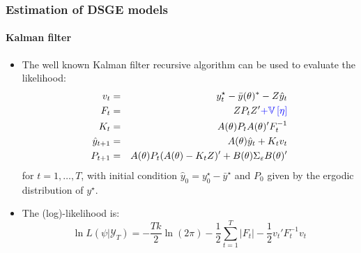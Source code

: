 \documentclass[10pt,slidestop]{beamer}
\newcommand{\sample}{\mathcal Y_T}
\begin{document}
\begin{frame}
  \frametitle{Estimation of DSGE models}
  \framesubtitle{Kalman filter}
  \begin{itemize}
  \item The well known Kalman filter recursive algorithm can be used to evaluate the likelihood:
  \begin{eqnarray*}
    v_t &=& y^{\star}_t - \bar y(\theta)^* - Z \hat y_t\\
    F_t &=& Z P_t Z' {\color{blue} + \mathbb V \left[\eta\right]}\\
    K_t &=& A(\theta) P_t A(\theta)'F_t^{-1}\\
    \hat y_{t+1} &=& A(\theta) \hat y_t + K_tv_t\\
    P_{t+1} &=& A(\theta) P_t (A(\theta)-K_t Z)'+B(\theta)\Sigma_{\varepsilon} B(\theta)'
  \end{eqnarray*}
  for $t=1,\ldots,T$, with initial condition
  $\hat{y}_0=y_0^{\star}-\bar y^{\star}$ and $P_0$ given by the ergodic
  distribution of $y^{\star}$.

  \bigskip

\item The (log)-likelihood is:
  \[
  \ln L\left(\psi|\sample\right) = -\frac{Tk}{2}\ln(2\pi)-\frac{1}{2}\sum_{t=1}^T|F_t|-\frac{1}{2}v_t'F_t^{-1}v_t
  \]
  \end{itemize}

\end{frame}
\end{document}
